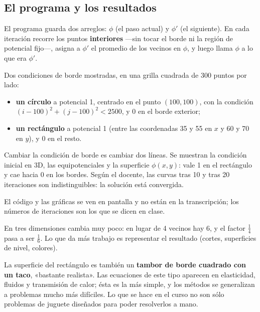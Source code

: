 \documentclass[12pt,a4paper]{article}
\begin{document}
\subsection{El programa y los resultados}

El programa guarda dos arreglos: $\phi$ (el paso actual) y $\phi'$ (el
siguiente). En cada iteración recorre los puntos \textbf{interiores} ---sin tocar el
borde ni la región de potencial fijo---, asigna a $\phi'$ el promedio de los
vecinos en $\phi$, y luego llama $\phi$ a lo que era $\phi'$.

Dos condiciones de borde mostradas, en una grilla cuadrada de 300 puntos por
lado:

\begin{itemize}
  \item \textbf{un círculo} a potencial 1, centrado en el punto $(100,100)$, con la
  condición $(i-100)^2+(j-100)^2<2500$, y 0 en el borde exterior;
  \item \textbf{un rectángulo} a potencial 1 (entre las coordenadas 35 y 55 en $x$ y 60 y
  70 en $y$), y 0 en el resto.
\end{itemize}

Cambiar la condición de borde es cambiar dos líneas. Se muestran la condición
inicial en 3D, las equipotenciales y la superficie $\phi(x,y)$: vale 1 en el
rectángulo y cae hacia 0 en los bordes. Según el docente, las curvas tras 10 y
tras 20 iteraciones son indistinguibles: la solución está convergida.

\begin{notebox}
El código y las gráficas se ven en pantalla y no están en la transcripción;
los números de iteraciones son los que se dicen en clase.
\end{notebox}

En tres dimensiones cambia muy poco: en lugar de 4 vecinos hay 6, y el factor
$\tfrac14$ pasa a ser $\tfrac16$. Lo que da más trabajo es representar el
resultado (cortes, superficies de nivel, colores).

\begin{notebox}
La superficie del rectángulo es también un \textbf{tambor de borde cuadrado con un
taco}, «bastante realista». Las ecuaciones de este tipo aparecen en
elasticidad, fluidos y transmisión de calor; ésta es la más simple, y los
métodos se generalizan a problemas mucho más difíciles. Lo que se hace en el
curso no son sólo problemas de juguete diseñados para poder resolverlos a
mano.
\end{notebox}
\end{document}
